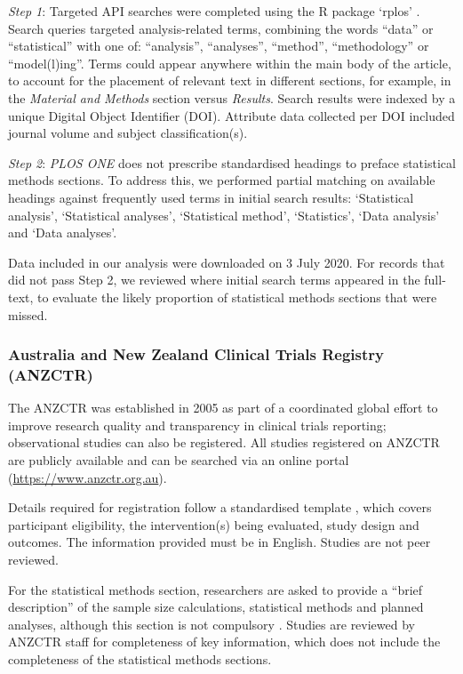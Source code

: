 \documentclass[12pt]{article}
\begin{document}
\emph{Step 1}: Targeted API searches were completed using the R package
`rplos' \citep{rplos}. Search queries targeted analysis-related terms,
combining the words ``data'' or ``statistical'' with one of:
``analysis'', ``analyses'', ``method'', ``methodology'' or
``model(l)ing''. Terms could appear anywhere within the main body of the
article, to account for the placement of relevant text in different
sections, for example, in the \emph{Material and Methods} section versus
\emph{Results}. Search results were indexed by a unique Digital Object
Identifier (DOI). Attribute data collected per DOI included journal
volume and subject classification(s).

\emph{Step 2}: \emph{PLOS ONE} does not prescribe standardised headings
to preface statistical methods sections. To address this, we performed
partial matching on available headings against frequently used terms in
initial search results: `Statistical analysis', `Statistical analyses',
`Statistical method', `Statistics', `Data analysis' and `Data analyses'.

Data included in our analysis were downloaded on 3 July 2020. For
records that did not pass Step 2, we reviewed where initial search terms
appeared in the full-text, to evaluate the likely proportion of
statistical methods sections that were missed.

\subsubsection{Australia and New Zealand Clinical Trials Registry (ANZCTR)}
\label{sec:methodsANZCTR}

The ANZCTR was established in 2005 as part of a coordinated global
effort to improve research quality and transparency in clinical trials
reporting; observational studies can also be registered. All studies
registered on ANZCTR are publicly available and can be searched via an
online portal (\url{https://www.anzctr.org.au}).

Details required for registration follow a standardised template
\citep{ANZCTR}, which covers participant eligibility, the
intervention(s) being evaluated, study design and outcomes. The
information provided must be in English. Studies are not peer reviewed.

For the statistical methods section, researchers are asked to provide a
``brief description'' of the sample size calculations, statistical
methods and planned analyses, although this section is not compulsory
\citep{ANZCTR}. Studies are reviewed by ANZCTR staff for completeness of
key information, which does not include the completeness of the
statistical methods sections.
\end{document}
